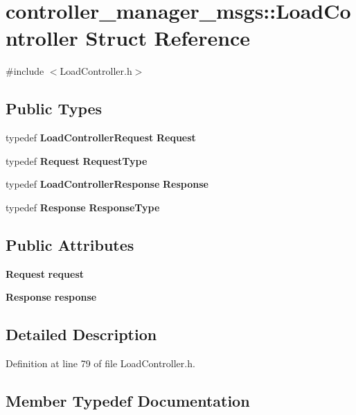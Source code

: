 \section{controller\-\_\-manager\-\_\-msgs\-:\-:\-Load\-Controller \-Struct \-Reference}
\label{structcontroller__manager__msgs_1_1LoadController}


{\ttfamily \#include $<$\-Load\-Controller.\-h$>$}

\subsection*{\-Public \-Types}
\begin{DoxyCompactItemize}
\item 
typedef {\bf \-Load\-Controller\-Request} {\bf \-Request}
\item 
typedef {\bf \-Request} {\bf \-Request\-Type}
\item 
typedef {\bf \-Load\-Controller\-Response} {\bf \-Response}
\item 
typedef {\bf \-Response} {\bf \-Response\-Type}
\end{DoxyCompactItemize}
\subsection*{\-Public \-Attributes}
\begin{DoxyCompactItemize}
\item 
{\bf \-Request} {\bf request}
\item 
{\bf \-Response} {\bf response}
\end{DoxyCompactItemize}


\subsection{\-Detailed \-Description}


\-Definition at line 79 of file \-Load\-Controller.\-h.



\subsection{\-Member \-Typedef \-Documentation}
